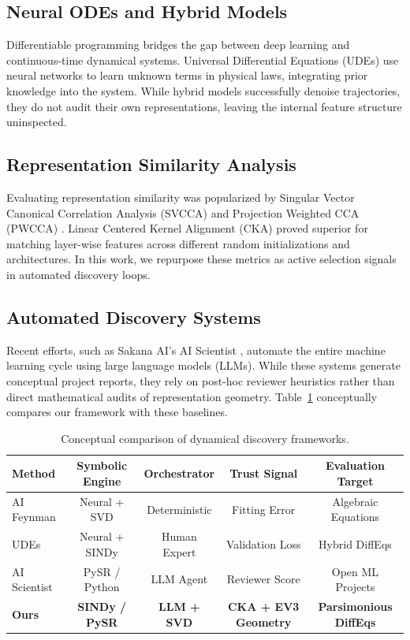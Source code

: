 \documentclass[twocolumn]{article}
\begin{document}
\subsection{Neural ODEs and Hybrid Models}
Differentiable programming bridges the gap between deep learning and continuous-time dynamical systems. Universal Differential Equations (UDEs) \citep{rackauckas2020universal} use neural networks to learn unknown terms in physical laws, integrating prior knowledge into the system. While hybrid models successfully denoise trajectories, they do not audit their own representations, leaving the internal feature structure uninspected.

\subsection{Representation Similarity Analysis}
Evaluating representation similarity was popularized by Singular Vector Canonical Correlation Analysis (SVCCA) \citep{raghu2017svcca} and Projection Weighted CCA (PWCCA) \citep{morcos2018pwcca}. Linear Centered Kernel Alignment (CKA) \citep{kornblith2019similarity} proved superior for matching layer-wise features across different random initializations and architectures. In this work, we repurpose these metrics as active selection signals in automated discovery loops.

\subsection{Automated Discovery Systems}
Recent efforts, such as Sakana AI's AI Scientist \citep{lu2023aiscientist}, automate the entire machine learning cycle using large language models (LLMs). While these systems generate conceptual project reports, they rely on post-hoc reviewer heuristics rather than direct mathematical audits of representation geometry. Table~\ref{tab:baselines} conceptually compares our framework with these baselines.

\begin{table}[t]
\centering
\caption{Conceptual comparison of dynamical discovery frameworks.}
\label{tab:baselines}
\begin{tabular}{lcccc}
\toprule
Method & Symbolic Engine & Orchestrator & Trust Signal & Evaluation Target \\
\midrule
AI Feynman \citep{udrescu2020ai} & Neural + SVD & Deterministic & Fitting Error & Algebraic Equations \\
UDEs \citep{rackauckas2020universal} & Neural + SINDy & Human Expert & Validation Loss & Hybrid DiffEqs \\
AI Scientist \citep{lu2023aiscientist} & PySR / Python & LLM Agent & Reviewer Score & Open ML Projects \\
\textbf{Ours} & \textbf{SINDy / PySR} & \textbf{LLM + SVD} & \textbf{CKA + EV3 Geometry} & \textbf{Parsimonious DiffEqs} \\
\bottomrule
\end{tabular}
\end{table}
\end{document}
